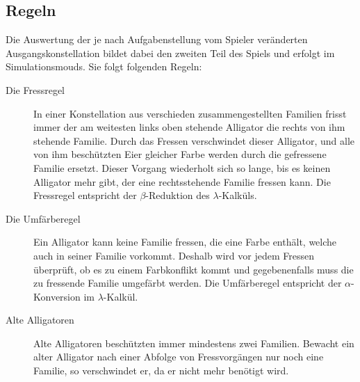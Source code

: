 \subsection{Regeln}
Die Auswertung der je nach Aufgabenstellung vom Spieler veränderten Ausgangskonstellation bildet dabei den zweiten Teil des Spiels und erfolgt im Simulationsmouds. Sie folgt folgenden Regeln:

\begin{description}
		\item[Die Fressregel] In einer Konstellation aus verschieden zusammengestellten Familien frisst immer der am weitesten links oben stehende Alligator die rechts von ihm stehende Familie.
		Durch das Fressen verschwindet dieser Alligator, und alle von ihm beschützten Eier gleicher Farbe werden durch die gefressene Familie ersetzt.
		Dieser Vorgang wiederholt sich so lange, bis es keinen Alligator mehr gibt, der eine rechtsstehende Familie fressen kann.
		Die Fressregel entspricht der \(\beta\)-Reduktion des \(\lambda\)-Kalküls.

		\item[Die Umfärberegel] Ein Alligator kann keine Familie fressen, die eine Farbe enthält, welche auch in seiner Familie vorkommt.
		Deshalb wird vor jedem Fressen überprüft, ob es zu einem Farbkonflikt kommt und gegebenenfalls muss die zu fressende Familie umgefärbt werden.
		Die Umfärberegel entspricht der \(\alpha\)-Konversion im \(\lambda\)-Kalkül.

		\item[Alte Alligatoren] Alte Alligatoren beschützten immer mindestens zwei Familien.
		Bewacht ein alter Alligator nach einer Abfolge von Fressvorgängen nur noch eine Familie, so verschwindet er, da er nicht mehr benötigt wird.

	\end{description}

